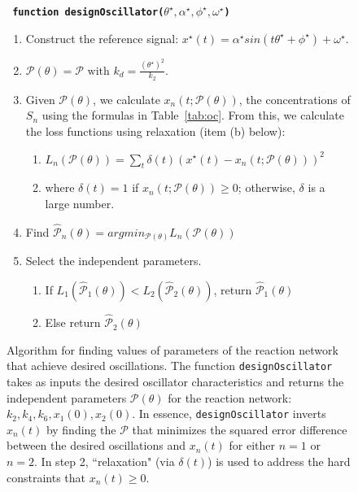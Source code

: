 \documentclass{bmcart}
\newcommand{\tab}[1]{Table~\ref{#1}}
\begin{document}
\begin{backmatter}
\begin{figure}
{\tt
{\bf function designOscillator($\theta^{\star}, \alpha^{\star}, \phi^{\star}, \omega^{\star}$)}
\begin{enumerate}

\item
Construct the reference signal:
$x^{\star}(t) = \alpha^{\star} sin(t \theta^{\star} + \phi^{\star}) + \omega^{\star}$.

\item
$\mathcal{P} ({\theta}) = \mathcal{P} \text{ with } k_d = \frac{(\theta^{\star})^2}{k_2}.$

\item Given $\mathcal{P} (\theta)$, we calculate $x_n(t; \mathcal{P}(\theta))$, the concentrations of $S_n$ using the formulas in \tab{tab:oc}. From this, we calculate the loss functions using relaxation (item (b) below):
\begin{enumerate}
\item
$L_n (\mathcal{P} ({\theta}))= \sum_t \delta(t) \left( x^{\star}(t) - x_n(t; \mathcal{P}(\theta)) \right)^2$
\item where $\delta(t) = 1$ if $x_n (t; \mathcal{P}(\theta))  \geq 0$; otherwise, $\delta$ is a large number.
\end{enumerate}

\item Find
$\hat{\mathcal{P}}_n (\theta) = argmin_{\mathcal{P}(\theta)} L_n (\mathcal{P} (\theta))$

\item Select the independent parameters.
\begin{enumerate}
\item If $L_1 (\hat{\mathcal{P}}_1 (\theta)) < L_2 (\hat{\mathcal{P}}_2 (\theta))$, return $\hat{\mathcal{P}}_1 (\theta)$
\item Else return $\hat{\mathcal{P}}_2 (\theta)$
\end{enumerate}

\end{enumerate}
}
\caption{Algorithm for finding values of parameters of the reaction network that achieve desired oscillations. The function {\tt designOscillator} takes
as inputs the desired oscillator characteristics and returns the independent parameters $\mathcal{P} (\theta)$ for
the reaction network: $k_2, k_4, k_6, x_1(0), x_2(0)$.
In essence, {\tt designOscillator}
inverts $x_n (t)$ by finding the $\mathcal{P}$ that minimizes
the squared error difference between the desired oscillations and $x_n (t)$ for either
$n=1$ or $n=2$.
In step 2, ``relaxation" (via $\delta (t)$) 
is used to address the hard constraints that $x_n (t) \geq 0$.}
\label{fig:design-oscillator}
\end{figure}


\end{backmatter}
\end{document}
